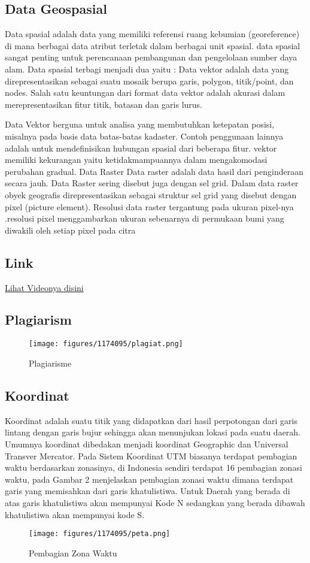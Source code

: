 \subsection{Data Geospasial}
Data spasial adalah data yang memiliki referensi ruang kebumian (georeference) di mana berbagai data atribut terletak dalam berbagai unit spasial. data spasial  sangat penting untuk perencanaan pembangunan dan pengelolaan sumber daya alam.
Data spasial terbagi menjadi dua yaitu :
Data vektor adalah data yang direpresentasikan sebagai suatu mosaik berupa garis, polygon, titik/point, dan nodes. Salah satu keuntungan dari format data vektor adalah akurasi dalam merepresentasikan fitur titik, batasan dan garis lurus.

Data Vektor berguna untuk analisa yang membutuhkan ketepatan posisi, misalnya pada basis data batas-batas kadaster. Contoh penggunaan lainnya adalah untuk mendefinisikan hubungan spasial dari beberapa fitur. vektor memiliki kekurangan yaitu ketidakmampuannya dalam mengakomodasi perubahan gradual.
	Data Raster
Data raster adalah data hasil dari penginderaan secara jauh. Data Raster sering disebut juga dengan sel grid. Dalam data raster obyek geografis direpresentasikan sebagai struktur sel grid yang disebut dengan pixel (picture element). Resolusi data raster tergantung pada ukuran pixel-nya .resolusi pixel menggambarkan ukuran sebenarnya di permukaan bumi yang diwakili oleh setiap pixel pada citra
\subsection{Link}
\href{https://www.youtube.com/watch?v=TdQz3NogjzM}{Lihat Videonya disini}
\subsection{Plagiarism}
\begin{figure}[H]
	\texttt{[image: figures/1174095/plagiat.png]}
	\centering
	\caption{Plagiarisme}
\end{figure}

\subsection{Koordinat}
Koordinat adalah suatu titik yang didapatkan dari hasil perpotongan dari garis lintang dengan garis bujur sehingga akan menunjukan lokasi pada suatu daerah. Umumnya koordinat dibedakan menjadi koordinat Geographic dan Universal Transver Mercator.
Pada Sistem Koordinat UTM biasanya terdapat pembagian waktu berdasarkan zonasinya, di Indonesia sendiri terdapat 16 pembagian zonasi waktu, pada Gambar 2 menjelaskan pembagian zonasi waktu dimana terdapat garis yang memisahkan dari garis khatulistiwa. Untuk Daerah yang berada di atas garis khatulistiwa akan mempunyai Kode N sedangkan yang berada dibawah khatulistiwa akan mempunyai kode S.

\begin{figure}[H]
	\texttt{[image: figures/1174095/peta.png]}
	\centering
	\caption{Pembagian Zona Waktu}
\end{figure}

